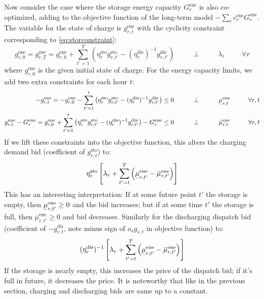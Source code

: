 \documentclass[final,3p]{elsarticle}
\def\l{\lambda} \def\K{\kappa} \def\m{\mu} \def\G{\Gamma} \def\d{\partial}
\begin{document}
Now consider the case where the storage energy capacity $G^{\textrm{ene}}_r$ is
also co-optimized, adding to the objective function of the long-term model
$-\sum_r c^{\textrm{ene}}_r G^{\textrm{ene}}_r$. The variable for the state of
charge is $g^{\textrm{ene}}_{r,t}$ with the cyclicity constraint corresponding to 
\eqref{eq:storconstraint}:
\begin{equation}
  g^{\textrm{ene}}_{r,0} = g^{\textrm{ene}}_{r,T} = g^{\textrm{ene}}_{r,0} + \sum_{t'=1}^T \left( \eta^{\textrm{sto}}_r g^{\textrm{sto}}_{r,t'} - (\eta^{\textrm{dis}}_r)^{-1} g^{\textrm{dis}}_{r,t'} \right)   \hspace{1cm}\perp \hspace{1cm} \lambda_{r} \hspace{1cm} \forall r
\end{equation}
where $g^{\textrm{ene}}_{r,0}$ is the given initial state of charge.
For the energy capacity limits, we add two extra constraints for each hour
$t$:
\begin{align}
  -g^{\textrm{ene}}_{r,t} =   -g^{\textrm{ene}}_{r,0} - \sum_{t'=1}^t \left( \eta^{\textrm{sto}}_r g^{\textrm{sto}}_{r,t'} - (\eta^{\textrm{dis}}_r)^{-1} g^{\textrm{dis}}_{r,t'} \right) \leq  0  \hspace{1cm}\perp \hspace{1cm} \ubar{\mu}^{\textrm{ene}}_{r,t} \hspace{1cm} \forall r,t \label{eq:enelower} \\
  g^{\textrm{ene}}_{r,t} - G^{\textrm{ene}}_r = g^{\textrm{ene}}_{r,0} + \sum_{t'=1}^t \left( \eta^{\textrm{sto}}_r g^{\textrm{sto}}_{r,t'} - (\eta^{\textrm{dis}}_r)^{-1} g^{\textrm{dis}}_{r,t'} \right) - G^{\textrm{ene}}_r \leq  0  \hspace{1cm}\perp \hspace{1cm} \bar{\mu}^{\textrm{ene}}_{r,t} \hspace{1cm} \forall r,t \label{eq:eneupper}
\end{align}
If we lift these constraints into the objective function, this alters the
charging demand bid (coefficient of  $g^{\textrm{sto}}_{r,t}$) to:
\begin{equation}
  \eta^{\textrm{sto}}_r \left[ \l_r + \sum_{t'=t}^T \left( \ubar{\mu}^{\textrm{ene}}_{r,t'} -\bar{\mu}^{\textrm{ene}}_{r,t'}  \right) \right]
\end{equation}
This has an interesting interpretation: If at some future point $t'$ the storage
is empty, then $\ubar{\mu}^{\textrm{ene}}_{r,t'} \geq 0$  and the bid increases;
but if at some time $t'$ the storage is full, then
$\bar{\mu}^{\textrm{ene}}_{r,t'} \geq 0$ and bid decreases.
Similarly for the discharging dispatch bid (coefficient of
$-g^{\textrm{dis}}_{r,t}$, note minus sign of $o_sg_{s,t}$ in objective
function) to:
\begin{equation}
  (\eta^{\textrm{dis}}_r)^{-1}\left[ \l_r + \sum_{t'=t}^T \left(\ubar{\mu}^{\textrm{ene}}_{r,t'} - \bar{\mu}^{\textrm{ene}}_{r,t'}  \right)\right]
\end{equation}
If the storage is nearly empty, this increases the price of the dispatch bid; if
it's full in future, it decreases the price. It is noteworthy that like in the
previous section, charging and discharging bids are same up to a constant.
\end{document}
